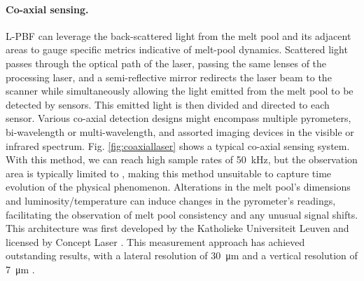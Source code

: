 \paragraph{Co-axial sensing.} L-PBF can leverage the back-scattered light from the melt pool and its adjacent areas to gauge specific metrics indicative of melt-pool dynamics. Scattered light passes through the optical path of the laser, passing the same lenses of the processing laser, and a semi-reflective mirror redirects the laser beam to the scanner while simultaneously allowing the light emitted from the melt pool to be detected by sensors. This emitted light is then divided and directed to each sensor. Various co-axial detection designs might encompass multiple pyrometers, bi-wavelength or multi-wavelength, and assorted imaging devices in the visible or infrared spectrum. Fig. \ref{fig:coaxiallaser} shows a typical co-axial sensing system. With this method, we can reach high sample rates of \SI{50}{\kilo\hertz}, but the observation area is typically limited to , making this method unsuitable to capture time evolution of the physical phenomenon. Alterations in the melt pool's dimensions and luminosity/temperature can induce changes in the pyrometer's readings, facilitating the observation of melt pool consistency and any unusual signal shifts. This architecture was first developed by the Katholieke Universiteit Leuven and licensed by Concept Laser \cite{colosimo_-machine_2020, kruth_jean-pierre_feedback_2007, berumen_quality_2010}. This measurement approach has achieved outstanding results, with a lateral resolution of \SI{30}{\micro\metre} and a vertical resolution of \SI{7}{\micro\metre} \cite{fleming_tracking_2020}.

